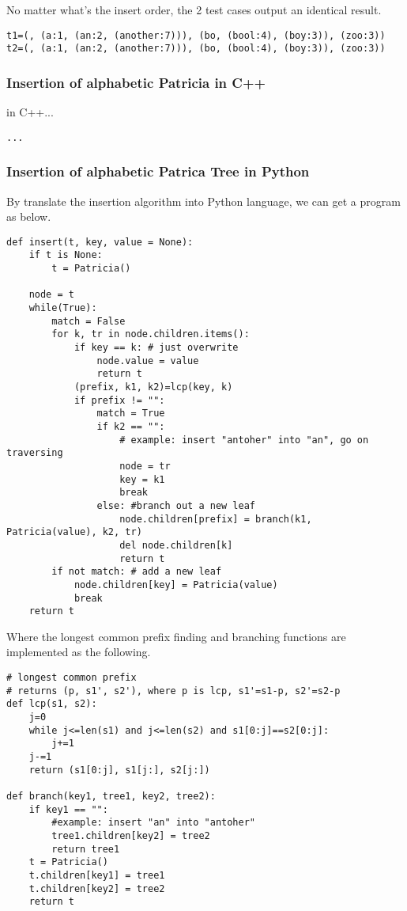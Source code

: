 \documentclass{article}
\begin{document}
No matter what's the insert order, the 2 test cases output an identical result.

\begin{verbatim}
t1=(, (a:1, (an:2, (another:7))), (bo, (bool:4), (boy:3)), (zoo:3))
t2=(, (a:1, (an:2, (another:7))), (bo, (bool:4), (boy:3)), (zoo:3))
\end{verbatim}

\subsubsection*{Insertion of alphabetic Patricia in C++}
in C++...

\lstset{language=C++}
\begin{lstlisting}
...
\end{lstlisting}


\subsubsection*{Insertion of alphabetic Patrica Tree in Python}
By translate the insertion algorithm into Python language, we can get a
program as below.

\lstset{language=Python}
\begin{lstlisting}
def insert(t, key, value = None):
    if t is None:
        t = Patricia()

    node = t
    while(True):
        match = False
        for k, tr in node.children.items():
            if key == k: # just overwrite
                node.value = value
                return t
            (prefix, k1, k2)=lcp(key, k)
            if prefix != "":
                match = True
                if k2 == "": 
                    # example: insert "antoher" into "an", go on traversing
                    node = tr
                    key = k1
                    break
                else: #branch out a new leaf
                    node.children[prefix] = branch(k1, Patricia(value), k2, tr)
                    del node.children[k]
                    return t
        if not match: # add a new leaf
            node.children[key] = Patricia(value)
            break
    return t
\end{lstlisting}

Where the longest common prefix finding and branching functions are implemented
as the following.

\begin{lstlisting}
# longest common prefix
# returns (p, s1', s2'), where p is lcp, s1'=s1-p, s2'=s2-p
def lcp(s1, s2):
    j=0
    while j<=len(s1) and j<=len(s2) and s1[0:j]==s2[0:j]:
        j+=1
    j-=1
    return (s1[0:j], s1[j:], s2[j:])

def branch(key1, tree1, key2, tree2):
    if key1 == "":
        #example: insert "an" into "antoher"
        tree1.children[key2] = tree2
        return tree1
    t = Patricia()
    t.children[key1] = tree1
    t.children[key2] = tree2
    return t
\end{lstlisting}
\end{document}
